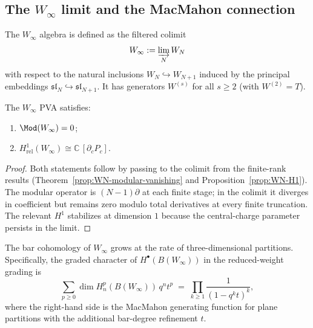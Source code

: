 \subsection{The $W_\infty$ limit and the MacMahon connection}

\begin{definition}
The $W_\infty$ algebra is defined as the filtered colimit
\[
W_\infty := \varinjlim_N W_N
\]
with respect to the natural inclusions
$W_N \hookrightarrow W_{N+1}$ induced by the principal embeddings
$\mathfrak{sl}_N \hookrightarrow \mathfrak{sl}_{N+1}$.
It has generators $W^{(s)}$ for all $s \ge 2$ (with $W^{(2)} = T$).
\end{definition}

\begin{proposition}
The $W_\infty$ PVA satisfies:
\begin{enumerate}[leftmargin=2.4em]
\item $\Mod(W_\infty) = 0$;
\item $H^1_{\mathrm{rel}}(W_\infty) \cong \mathbb{C}\,[\partial_c P_c]$.
\end{enumerate}
\end{proposition}

\begin{proof}
Both statements follow by passing to the colimit from the finite-rank
results (Theorem~\ref{prop:WN-modular-vanishing} and Proposition~\ref{prop:WN-H1}).
The modular operator is $(N-1)\partial$ at each finite stage; in the
colimit it diverges in coefficient but remains zero modulo total derivatives
at every finite truncation. The relevant $H^1$ stabilizes at dimension $1$
because the central-charge parameter persists in the limit.
\end{proof}

\begin{theorem}
The bar cohomology of $W_\infty$ grows at the rate of three-dimensional
partitions. Specifically, the graded character of $H^\bullet(B(W_\infty))$
in the reduced-weight grading is
\[
\sum_{p \ge 0} \dim H^p_n(B(W_\infty))\, q^n t^p
\;=\;
\prod_{k \ge 1} \frac{1}{(1 - q^k t)^k},
\]
where the right-hand side is the MacMahon generating function for
plane partitions with the additional bar-degree refinement $t$.
\end{theorem}

